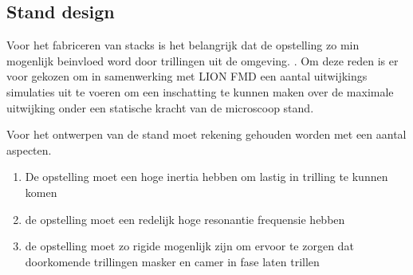 \documentclass[11pt]{article}
\begin{document}
\subsection{Stand design}

Voor het fabriceren van stacks is het belangrijk dat de opstelling zo min mogenlijk beinvloed word door trillingen uit de omgeving. . Om deze reden is er voor gekozen om in samenwerking met LION FMD een aantal uitwijkings simulaties uit te voeren om een inschatting te kunnen maken over de maximale uitwijking onder een statische kracht van de microscoop stand. 

Voor het ontwerpen van de stand moet rekening gehouden worden met een aantal aspecten.

\begin{enumerate}[noitemsep]
    \item De opstelling moet een hoge inertia hebben om lastig in trilling te kunnen komen
    \item de opstelling moet een redelijk hoge resonantie frequensie hebben
    \item de opstelling moet zo rigide mogenlijk zijn om ervoor te zorgen dat doorkomende trillingen masker en camer in fase laten trillen
\end{enumerate}
\end{document}

